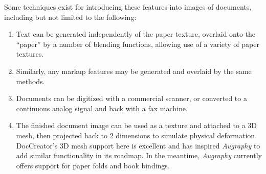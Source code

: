 \documentclass[runningheads]{llncs}
\begin{document}
\begin{samepage}
\noindent Some techniques exist for introducing these features into images of documents, including but not limited to the following:
\begin{enumerate}
\item Text can be generated independently of the paper texture, overlaid onto the ``paper'' by a number of blending functions, allowing use of a variety of paper textures.
\item Similarly, any markup features may be generated and overlaid by the same methods.
\item Documents can be digitized with a commercial scanner, or converted to a continuous analog signal and back with a fax machine.
\item The finished document image can be used as a texture and attached to a 3D mesh, then projected back to 2 dimensions to simulate physical deformation. DocCreator's 3D mesh support here is excellent and has inspired \emph{Augraphy} to add similar functionality in its roadmap. In the meantime, \emph{Augraphy} currently offers support for paper folds and book bindings.
\end{enumerate}
\end{samepage}
\end{document}
